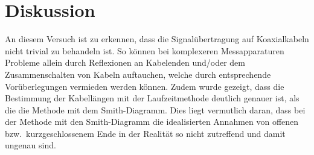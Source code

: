 

\section{Diskussion}

An diesem Versuch ist zu erkennen, dass die Signalübertragung auf Koaxialkabeln
nicht trivial zu behandeln ist. So können bei komplexeren Messapparaturen
Probleme allein durch Reflexionen an Kabelenden und/oder dem Zusammenschalten
von Kabeln auftauchen, welche durch entsprechende Vorüberlegungen vermieden
werden können. Zudem wurde gezeigt, dass die Bestimmung der Kabellängen
mit der Laufzeitmethode deutlich genauer ist, als die die Methode mit dem
Smith-Diagramm. Dies liegt vermutlich daran, dass bei der Methode mit den
Smith-Diagramm die idealisierten Annahmen von offenen bzw.\ kurzgeschlossenem
Ende in der Realität so nicht zutreffend und damit ungenau sind.
